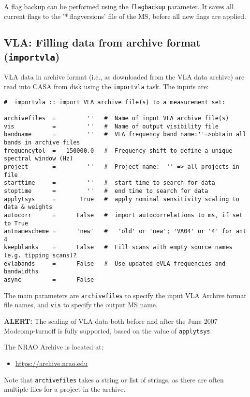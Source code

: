 A flag backup can be performed using the {\tt flagbackup}
parameter. It saves all current flags to the '*.flagversions' file of
the MS, before all new flags are applied.


\subsection{VLA: Filling data from archive format ({\tt importvla})}
\label{section:io.import.vla}

VLA data in archive format (i.e., as downloaded from the VLA data archive)
are read into CASA from disk using the {\tt importvla} task.  The inputs are:
\small
\begin{verbatim}
#  importvla :: import VLA archive file(s) to a measurement set:

archivefiles  =         ''   #  Name of input VLA archive file(s)
vis           =         ''   #  Name of output visibility file
bandname      =         ''   #  VLA frequency band name:''=>obtain all bands in archive files
frequencytol  =   150000.0   #  Frequency shift to define a unique spectral window (Hz)
project       =         ''   #  Project name:  '' => all projects in file
starttime     =         ''   #  start time to search for data
stoptime      =         ''   #  end time to search for data
applytsys     =       True   #  apply nominal sensitivity scaling to data & weights
autocorr      =      False   #  import autocorrelations to ms, if set to True
antnamescheme =      'new'   #   'old' or 'new'; 'VA04' or '4' for ant 4
keepblanks    =      False   #  Fill scans with empty source names (e.g. tipping scans)?
evlabands     =      False   #  Use updated eVLA frequencies and bandwidths
async         =      False        
\end{verbatim}
\normalsize

The main parameters are {\tt archivefiles} to specify the input
VLA Archive format file names, and {\tt vis} to specify the output
MS name. 

{\bf ALERT:} The scaling of VLA data both before and after the
June 2007 Modcomp-turnoff is fully supported, based on the value of
{\tt applytsys}.  

The NRAO Archive is located at:
\begin{itemize}
  \item \url{https://archive.nrao.edu}
\end{itemize}
Note that {\tt archivefiles} takes a string or list of
strings, as there are often multiple files for a project in the
archive.

